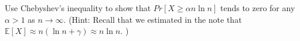 \documentclass[11pt]{article}
\newif\ifsolutions
\begin{document}
\begin{enumerate}
\begin{enumerate}[a)]
 Use Chebyshev's inequality to show that $Pr[ X \geq \alpha n
  \ln{n}]$ tends to zero for any $\alpha > 1$ as $n \rightarrow
  \infty$. (Hint: Recall that we estimated in the note that
  $\mathbb{E}[X] \approx n(\ln{n} + \gamma) \approx n \ln{n}$. ) 

\ifsolutions{\color{blue}{ 


\begin{align*}
Pr[ X \geq \alpha n\ln{n}] &\approx Pr[ X \geq (\alpha-1)n\ln{n} + \mathbb{E}[X]] \\ 
&=  Pr[ X - \mathbb{E}[X] \geq (\alpha - 1)n\ln{n} ] \\
&\leq Pr[ | X - \mathbb{E}[X] | \geq (\alpha-1)n\ln{n} ] \\
&\leq \frac{Var[X]}{((\alpha-1)n\ln{n})^2} \\
&\leq \frac{2n^2}{((\alpha-1)^2n^2(\ln{n})^2} \\
&= \frac{2}{(\alpha-1)^2(\ln{n})^2} \\
& \lim_{n \to \infty} \frac{2}{(\alpha-1)^2(\ln{n})^2}  = 0 \\
\end{align*}
}}\fi


\end{enumerate}


\end{enumerate}
\end{document}
